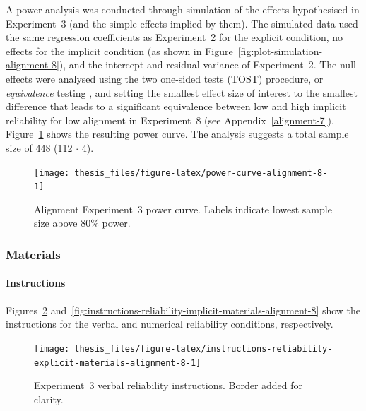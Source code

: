 \documentclass[a4paper, nobind, dvipsnames]{templates/ociamthesis}
\theoremstyle{definition}
\theoremstyle{definition}
\theoremstyle{definition}
\theoremstyle{definition}
\theoremstyle{remark}
\begin{document}
A power analysis was conducted through simulation of the effects hypothesised in
Experiment~3 (and the simple effects implied by them). The simulated data used
the same regression coefficients as Experiment~2 for the explicit condition, no
effects for the implicit condition (as shown in
Figure~\ref{fig:plot-simulation-alignment-8}), and the intercept and residual
variance of Experiment~2. The null effects were analysed using the two one-sided
tests (TOST) procedure, or \emph{equivalence} testing \autocite{lakens2018}, and setting the
smallest effect size of interest to the smallest difference that leads to a
significant equivalence between low and high implicit reliability for low
alignment in Experiment~8 (see Appendix~\ref{alignment-7}).
Figure~\ref{fig:power-curve-alignment-8} shows the resulting power curve. The
analysis suggests a total sample size of 448
(112 \(\cdot\) 4).

\newpage

\begin{landscape}



\begin{figure}
\texttt{[image: thesis\_files/figure-latex/power-curve-alignment-8-1]} \caption{Alignment Experiment~3 power curve. Labels indicate lowest sample size above 80\% power.}\label{fig:power-curve-alignment-8}
\end{figure}

\end{landscape}

\newpage

\subsubsection{Materials}

\hypertarget{instructions-materials-alignment-8-appendix}{%
\paragraph{Instructions}\label{instructions-materials-alignment-8-appendix}}

Figures~\ref{fig:instructions-reliability-explicit-materials-alignment-8}
and~\ref{fig:instructions-reliability-implicit-materials-alignment-8} show the
instructions for the verbal and numerical reliability conditions, respectively.



\begin{figure}
\texttt{[image: thesis\_files/figure-latex/instructions-reliability-explicit-materials-alignment-8-1]} \caption{Experiment~3 verbal reliability instructions. Border added for clarity.}\label{fig:instructions-reliability-explicit-materials-alignment-8}
\end{figure}
\end{document}
